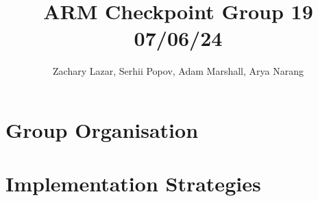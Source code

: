 \documentclass[11pt]{article}
\begin{document}
\title{ARM Checkpoint Group 19 07/06/24}
\author{Zachary Lazar, Serhii Popov, Adam Marshall, Arya Narang}

\maketitle

\section{Group Organisation}


\section{Implementation Strategies}

\end{document}
